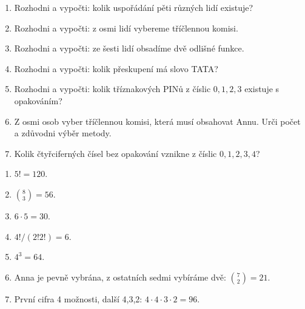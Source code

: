 \documentclass[11pt,a4paper]{article}
\begin{document}
\begin{zadaniReseniBox}[title={Domácí úkol}]

\begin{enumerate}[label=\alph*),leftmargin=*,itemsep=2pt]

\item Rozhodni a vypočti: kolik uspořádání pěti různých lidí existuje?
\item Rozhodni a vypočti: z osmi lidí vybereme tříčlennou komisi.
\item Rozhodni a vypočti: ze šesti lidí obsadíme dvě odlišné funkce.
\item Rozhodni a vypočti: kolik přeskupení má slovo TATA?
\item Rozhodni a vypočti: kolik tříznakových PINů z číslic $0,1,2,3$ existuje s opakováním?
\item Z osmi osob vyber tříčlennou komisi, která musí obsahovat Annu. Urči počet a zdůvodni výběr metody.
\item Kolik čtyřciferných čísel bez opakování vznikne z číslic $0,1,2,3,4$?

\end{enumerate}

\tcblower

\begin{enumerate}[label=\alph*),leftmargin=*,itemsep=2pt]

\item $5!=120$.
\item $\binom83=56$.
\item $6\cdot5=30$.
\item $4!/(2!2!)=6$.
\item $4^3=64$.
\item Anna je pevně vybrána, z ostatních sedmi vybíráme dvě: $\binom72=21$.
\item První cifra 4 možnosti, další 4,3,2: $4\cdot4\cdot3\cdot2=96$.

\end{enumerate}

\end{zadaniReseniBox}


\end{document}
